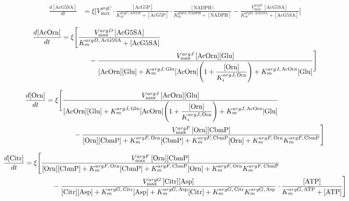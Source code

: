 \begin{align}
\frac{d[\mathrm{AcG5SA}]}{dt}
  &= \xi \Biggl[
      V_{\max}^{argC}
      \cdot\frac{[\mathrm{AcG5P}]}{K_m^{argC,\,\mathrm{AcG5P}}+[\mathrm{AcG5P}]}
      \cdot\frac{[\mathrm{NADPH}]}{K_m^{ghdA,\,\mathrm{NADPH}}+[\mathrm{NADPH}]}
      -
      \frac{V_{\max}^{argD}\,[\mathrm{AcG5SA}]}{K_m^{argD,\,\mathrm{AcG5SA}}+[\mathrm{AcG5SA}]}
    \Biggr]
\label{eq:dAcG5SA}
\end{align}

\begin{align}
\frac{d[\mathrm{AcOrn}]}{dt}
  &= \xi \Biggl[
      \frac{V_{\max}^{argD}\,[\mathrm{AcG5SA}]}{K_m^{argD,\,\mathrm{AcG5SA}}+[\mathrm{AcG5SA}]}
  \notag\\
  &\qquad\qquad -
      \frac{V_{\max}^{argJ}\,[\mathrm{AcOrn}][\mathrm{Glu}]}
           {[\mathrm{AcOrn}][\mathrm{Glu}]
            +K_m^{argJ,\,\mathrm{Glu}}[\mathrm{AcOrn}]
             \!\left(1+\dfrac{[\mathrm{Orn}]}{K_i^{argJ,\,\mathrm{Orn}}}\right)
            +K_m^{argJ,\,\mathrm{AcOrn}}[\mathrm{Glu}]}
    \Biggr]
\label{eq:dAcOrn}
\end{align}

\begin{align}
\frac{d[\mathrm{Orn}]}{dt}
  &= \xi \Biggl[
      \frac{V_{\max}^{argJ}\,[\mathrm{AcOrn}][\mathrm{Glu}]}
           {[\mathrm{AcOrn}][\mathrm{Glu}]
            +K_m^{argJ,\,\mathrm{Glu}}[\mathrm{AcOrn}]
             \!\left(1+\dfrac{[\mathrm{Orn}]}{K_i^{argJ,\,\mathrm{Orn}}}\right)
            +K_m^{argJ,\,\mathrm{AcOrn}}[\mathrm{Glu}]}
  \notag\\
  &\qquad\qquad -
      \frac{V_{\max}^{argF}\,[\mathrm{Orn}][\mathrm{CbmP}]}
           {[\mathrm{Orn}][\mathrm{CbmP}]
            +K_m^{argF,\,\mathrm{Orn}}[\mathrm{CbmP}]
            +K_m^{argF,\,\mathrm{CbmP}}[\mathrm{Orn}]
            +K_m^{argF,\,\mathrm{Orn}}K_m^{argF,\,\mathrm{CbmP}}}
    \Biggr]
\label{eq:dOrn}
\end{align}

\begin{align}
\frac{d[\mathrm{Citr}]}{dt}
  &= \xi \Biggl[
      \frac{V_{\max}^{argF}\,[\mathrm{Orn}][\mathrm{CbmP}]}
           {[\mathrm{Orn}][\mathrm{CbmP}]
            +K_m^{argF,\,\mathrm{Orn}}[\mathrm{CbmP}]
            +K_m^{argF,\,\mathrm{CbmP}}[\mathrm{Orn}]
            +K_m^{argF,\,\mathrm{Orn}}K_m^{argF,\,\mathrm{CbmP}}}
  \notag\\
  &\qquad\qquad -
      \frac{V_{\max}^{argG}\,[\mathrm{Citr}][\mathrm{Asp}]}
           {[\mathrm{Citr}][\mathrm{Asp}]
            +K_m^{argG,\,\mathrm{Citr}}[\mathrm{Asp}]
            +K_m^{argG,\,\mathrm{Asp}}[\mathrm{Citr}]
            +K_m^{argG,\,\mathrm{Citr}}K_m^{argG,\,\mathrm{Asp}}}
      \cdot\frac{[\mathrm{ATP}]}{K_m^{argG,\,\mathrm{ATP}}+[\mathrm{ATP}]}
    \Biggr]
\label{eq:dCitr}
\end{align}

